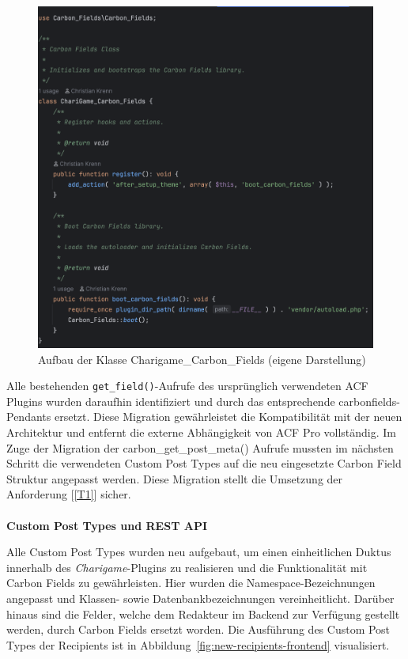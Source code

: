 \begin{figure}[H]
    \centering
    \includegraphics[width=1\textwidth]{images/carbon_fields_init}
    \caption{Aufbau der Klasse Charigame\_Carbon\_Fields (eigene Darstellung)}
    \label{fig:carbon-fields-init}
\end{figure}

Alle bestehenden \texttt{get\_field()}-Aufrufe des ursprünglich verwendeten ACF Plugins wurden daraufhin identifiziert und durch das entsprechende \gls{carbonfields}-Pendants ersetzt.
Diese Migration gewährleistet die Kompatibilität mit der neuen Architektur und entfernt die externe Abhängigkeit von ACF Pro vollständig.
Im Zuge der Migration der carbon\_get\_post\_meta() Aufrufe mussten im nächsten Schritt die verwendeten Custom Post Types auf die neu eingesetzte Carbon Field Struktur angepasst werden.
Diese Migration stellt die Umsetzung der Anforderung [\ref{T1}] sicher.
\\\\
\textbf{Custom Post Types und REST API}

Alle Custom Post Types wurden neu aufgebaut, um einen einheitlichen Duktus innerhalb des \textit{Charigame}-Plugins zu realisieren und die Funktionalität mit Carbon Fields zu gewährleisten.
Hier wurden die Namespace-Bezeichnungen angepasst und Klassen- sowie Datenbankbezeichnungen vereinheitlicht.
Darüber hinaus sind die Felder, welche dem Redakteur im Backend zur Verfügung gestellt werden, durch Carbon Fields ersetzt worden.
Die Ausführung des Custom Post Types der Recipients ist in Abbildung~\ref{fig:new-recipients-frontend} visualisiert.


